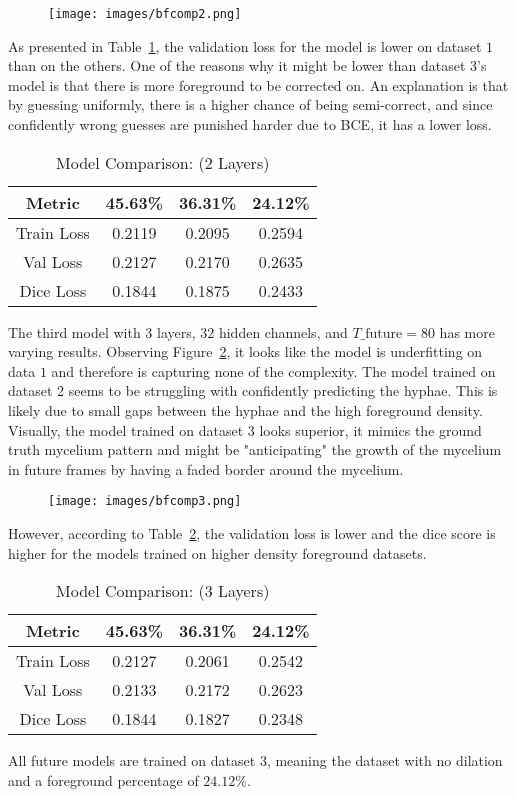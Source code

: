 \documentclass[a4paper,12pt]{article}
\begin{document}
\begin{figure}[H]
\centering
\texttt{[image: images/bfcomp2.png]}
\caption{} %
\label{fig:n15}
\end{figure}
As presented in Table~\ref{tab:2}, the validation loss for the model is lower on dataset $1$ than on the others. One of the reasons why it might be lower than dataset $3$'s model is that there is more foreground to be corrected on. An explanation is that by guessing uniformly, there is a higher chance of being semi-correct, and since confidently wrong guesses are punished harder due to BCE, it has a lower loss.




\begin{table}[H]
\centering
\caption{Model Comparison: (2 Layers)}
\label{tab:2}
\begin{tabular}{|c|c|c|c|}
\hline
Metric & 45.63\% & 36.31\% & 24.12\% \\
\hline
Train Loss & 0.2119 & 0.2095 & 0.2594 \\
Val Loss   & 0.2127 & 0.2170 & 0.2635 \\
Dice Loss  & 0.1844 & 0.1875 & 0.2433 \\
\hline
\end{tabular}
\end{table}
The third model with $3$ layers, $32$ hidden channels, and $T\_\text{future} = 80$ has more varying results. Observing Figure~\ref{fig:n16}, it looks like the model is underfitting on data $1$ and therefore is capturing none of the complexity. The model trained on dataset 2 seems to be struggling with confidently predicting the hyphae. This is likely due to small gaps between the hyphae and the high foreground density. Visually, the model trained on dataset $3$ looks superior, it mimics the ground truth mycelium pattern and might be "anticipating" the growth of the mycelium in future frames by having a faded border around the mycelium.
\begin{figure}[H]
\centering
\texttt{[image: images/bfcomp3.png]}
\caption{} %
\label{fig:n16}
\end{figure}
However, according to Table~\ref{tab:3}, the validation loss is lower and the dice score is higher for the models trained on higher density foreground datasets.
\begin{table}[H]
\centering
\caption{Model Comparison: (3 Layers)}
\label{tab:3}
\begin{tabular}{|c|c|c|c|}
\hline
Metric & 45.63\% & 36.31\% & 24.12\% \\
\hline
Train Loss & 0.2127 & 0.2061 & 0.2542 \\
Val Loss   & 0.2133 & 0.2172 & 0.2623 \\
Dice Loss  & 0.1844 & 0.1827 & 0.2348 \\
\hline
\end{tabular}
\end{table}
All future models are trained on dataset 3, meaning the dataset with no dilation and a foreground percentage of $24.12\%$.
\end{document}
